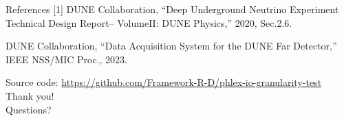 \documentclass[aspectratio=169]{beamer}
\begin{document}
\begin{frame}{References}
\small
[1] DUNE Collaboration, “Deep Underground Neutrino Experiment Technical Design Report– VolumeII: DUNE Physics,” 2020, Sec.2.6.\par
[2] DUNE Collaboration, “Data Acquisition System for the DUNE Far Detector,” IEEE NSS/MIC Proc., 2023.\\
\end{frame}

\begin{frame}[standout]
\large Source code: \url{https://github.com/Framework-R-D/phlex-io-granularity-test}
\vspace{3em}\\
Thank you! \\
Questions?\\[0.8em]
\end{frame}
\end{document}
